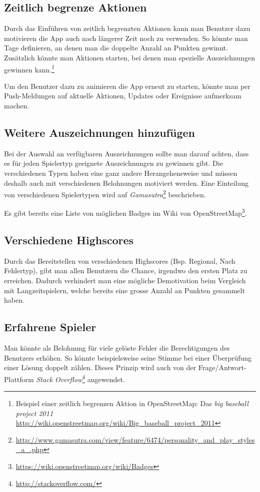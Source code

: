 \subsection{Zeitlich begrenze Aktionen}
Durch das Einführen von zeitlich begrenzten Aktionen kann man Benutzer dazu motivieren die App auch nach längerer Zeit noch zu verwenden.
So könnte man Tage definieren, an denen man die doppelte Anzahl an Punkten gewinnt.
Zusätzlich könnte man Aktionen starten, bei denen man spezielle Auszeichnungen gewinnen kann.\footnote{Beispiel einer zeitlich begrenzen Aktion in \gls{OpenStreetMap}: Das \emph{big baseball project 2011} \url{http://wiki.openstreetmap.org/wiki/Big_baseball_project_2011}}

Um den Benutzer dazu zu animieren die App erneut zu starten, könnte man per Push-Meldungen auf aktuelle Aktionen, Updates oder Ereignisse aufmerksam machen.

\subsection{Weitere Auszeichnungen hinzufügen}
Bei der Auswahl an verfügbaren Auszeichnungen sollte man darauf achten, dass es für jeden Spielertyp geeignete Auszeichnungen zu gewinnen gibt.
Die verschiedenen Typen haben eine ganz andere Herangehensweise und müssen deshalb auch mit verschiedenen Belohnungen motiviert werden.
Eine Einteilung von verschiedenen Spielertypen wird auf \emph{Gamasutra}\footnote{\url{http://www.gamasutra.com/view/feature/6474/personality_and_play_styles_a_.php}} beschrieben.

Es gibt bereits eine Liste von möglichen Badges im Wiki von OpenStreetMap\footnote{\url{https://wiki.openstreetmap.org/wiki/Badges}}.

\subsection{Verschiedene Highscores}
Durch das Bereitstellen von verschiedenen Highscores (Bsp. Regional, Nach Fehlertyp), gibt man allen Benutzern die Chance, irgendwo den ersten Platz zu erreichen.
Dadurch verhindert man eine mögliche Demotivation beim Vergleich mit Langzeitspielern, welche bereits eine grosse Anzahl an Punkten gesammelt haben.

\subsection{Erfahrene Spieler}
Man könnte als Belohnung für viele gelöste Fehler die Berechtigungen des Benutzers erhöhen.
So könnte beispielsweise seine Stimme bei einer Überprüfung einer Lösung doppelt zählen.
Dieses Prinzip wird auch von der Frage/Antwort-Plattform \emph{Stack Overflow}\footnote{\url{http://stackoverflow.com/}} angewendet.

